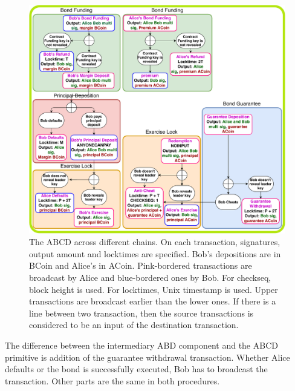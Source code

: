 \begin{figure}[]
  \centering
  \includegraphics[width=\linewidth]{figures/bond-third.pdf}
  \caption{The ABCD across different chains. On each transaction, signatures, output amount and locktimes are specified. Bob's depositions are in BCoin and Alice's in ACoin. Pink-bordered transactions are broadcast by Alice and blue-bordered ones by Bob. For checkseq, block height is used. For locktimes, Unix timestamp is used. Upper transactions are broadcast earlier than the lower ones. If there is a line between two transaction, then the source transactions is considered to be an input of the destination transaction.}
  \label{fig:cross-chain-non-collat-bond}
\end{figure}

The difference between the intermediary ABD component and the ABCD primitive is addition of the guarantee withdrawal transaction. Whether Alice defaults or the bond is successfully executed, Bob has to broadcast the  transaction. Other parts are the same in both procedures.
